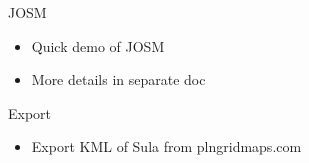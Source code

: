 \documentclass{beamer}
\begin{document}
\begin{frame}{JOSM}
  \begin{itemize}
  \item[] Quick demo of JOSM
  \item[] More details in separate doc
  \end{itemize}
\end{frame}

\begin{frame}{Export}

  \begin{itemize}
  \item[] Export KML of Sula from plngridmaps.com
  \end{itemize}
  
\end{frame}
\end{document}
